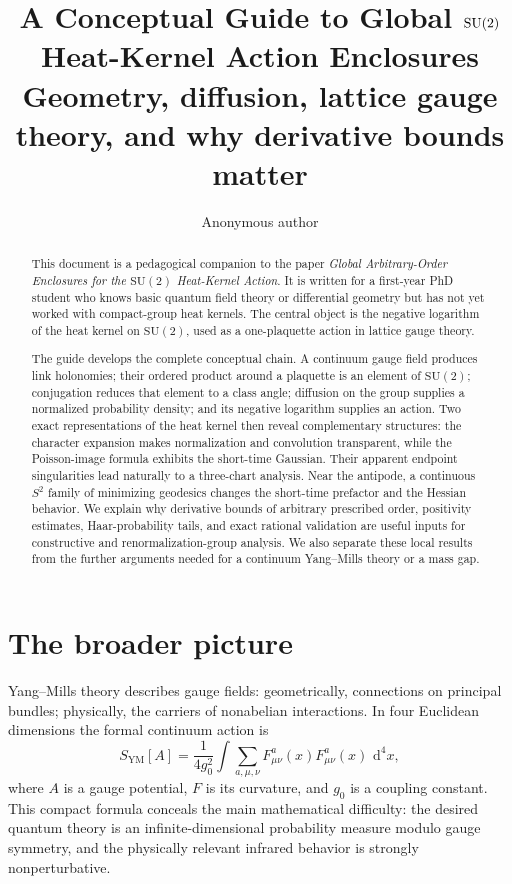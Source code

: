 \documentclass[11pt]{article}
\title{A Conceptual Guide to Global $\SU$ Heat-Kernel Action Enclosures\\
\large Geometry, diffusion, lattice gauge theory, and why derivative bounds matter}
\author{Anonymous author}
\date{}
\theoremstyle{definition}
\newcommand{\SU}{\mathrm{SU}(2)}
\newcommand{\dd}{\,\mathrm{d}}
\begin{document}
\maketitle

\begin{abstract}
This document is a pedagogical companion to the paper
\emph{Global Arbitrary-Order Enclosures for the $\SU$ Heat-Kernel Action}.
It is written for a first-year PhD student who knows basic quantum field
theory or differential geometry but has not yet worked with compact-group
heat kernels.  The central object is the negative logarithm of the heat
kernel on $\SU$, used as a one-plaquette action in lattice gauge theory.

The guide develops the complete conceptual chain.  A continuum gauge field
produces link holonomies; their ordered product around a plaquette is an
element of $\SU$; conjugation reduces that element to a class angle; diffusion
on the group supplies a normalized probability density; and its negative
logarithm supplies an action.  Two exact representations of the heat kernel
then reveal complementary structures: the character expansion makes
normalization and convolution transparent, while the Poisson-image formula
exhibits the short-time Gaussian.  Their apparent endpoint singularities
lead naturally to a three-chart analysis.  Near the antipode, a continuous
$S^2$ family of minimizing geodesics changes the short-time prefactor and the
Hessian behavior.  We explain why derivative bounds of arbitrary prescribed
order, positivity estimates, Haar-probability tails, and exact rational
validation are useful inputs for constructive and renormalization-group
analysis.  We also separate these local results from the further arguments
needed for a continuum Yang--Mills theory or a mass gap.
\end{abstract}

\tableofcontents

\section{The broader picture}

Yang--Mills theory describes gauge fields: geometrically, connections on
principal bundles; physically, the carriers of nonabelian interactions.  In
four Euclidean dimensions the formal continuum action is
\begin{equation}\label{expl:eq:continuum-action}
 S_{\mathrm{YM}}[A]
 =\frac{1}{4g_0^2}\int \sum_{a,\mu,\nu}
 F_{\mu\nu}^a(x)F_{\mu\nu}^a(x)\,\dd^4x,
\end{equation}
where $A$ is a gauge potential, $F$ is its curvature, and $g_0$ is a coupling
constant.  This compact formula conceals the main mathematical difficulty:
the desired quantum theory is an infinite-dimensional probability measure
modulo gauge symmetry, and the physically relevant infrared behavior is
strongly nonperturbative.
\end{document}
